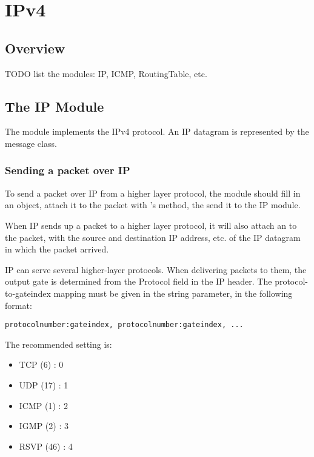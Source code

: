 \chapter{IPv4}
\label{cha:ipv4}


\section{Overview}

TODO list the modules: IP, ICMP, RoutingTable, etc.


\section{The IP Module}

The  module implements the IPv4 protocol. An IP datagram
is represented by the  message class.

\subsection{Sending a packet over IP}

To send a packet over IP from a higher layer protocol, the module should
fill in an  object, attach it to the packet with
's  method, the send it to the IP
module.

When IP sends up a packet to a higher layer protocol, it will also attach
an  to the packet, with the source and destination
IP address, etc. of the IP datagram in which the packet arrived.

IP can serve several higher-layer protocols. When delivering packets to
them, the output gate is determined from the Protocol field in the IP
header. The protocol-to-gateindex mapping must be given in the
 string parameter, in the following format:

\begin{verbatim}
protocolnumber:gateindex, protocolnumber:gateindex, ...
\end{verbatim}

The recommended setting is:

\begin{itemize}
  \item TCP (6) : 0
  \item UDP (17) : 1
  \item ICMP (1) : 2
  \item IGMP (2) : 3
  \item RSVP (46) : 4
\end{itemize}


